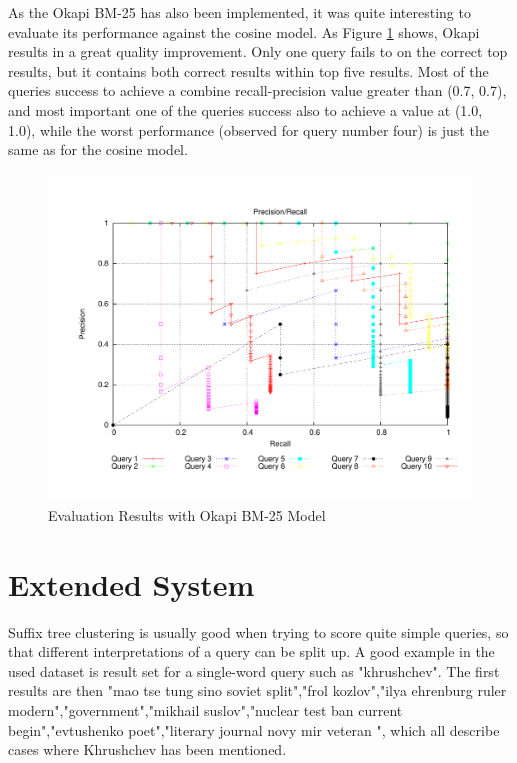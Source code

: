 As the Okapi BM-25 has also been implemented, it was quite interesting to evaluate its performance against the cosine model. As Figure \ref{fig:okapi} shows, Okapi results in a great quality improvement. Only one query fails to on the correct top results, but it contains both correct results within top five results. Most of the queries success to achieve a combine recall-precision value greater than (0.7, 0.7), and most important one of the queries success also to achieve a value at (1.0, 1.0), while the worst performance (observed for query number four) is just the same as for the cosine model.

\begin{figure}
\includegraphics[width=1.0\textwidth]{include/bench_okapi}
\caption{Evaluation Results with Okapi BM-25 Model}
\label{fig:okapi}
\end{figure}

\section{Extended System}
Suffix tree clustering is usually good when trying to score quite simple queries, so that different interpretations of a query can be split up. A good example in the used dataset is result set for a single-word query such as "khrushchev". The first results are then "mao tse tung sino soviet split","frol kozlov","ilya ehrenburg ruler modern","government","mikhail suslov","nuclear test ban current begin","evtushenko poet","literary journal novy mir veteran ", which all describe cases where Khrushchev has been mentioned.

